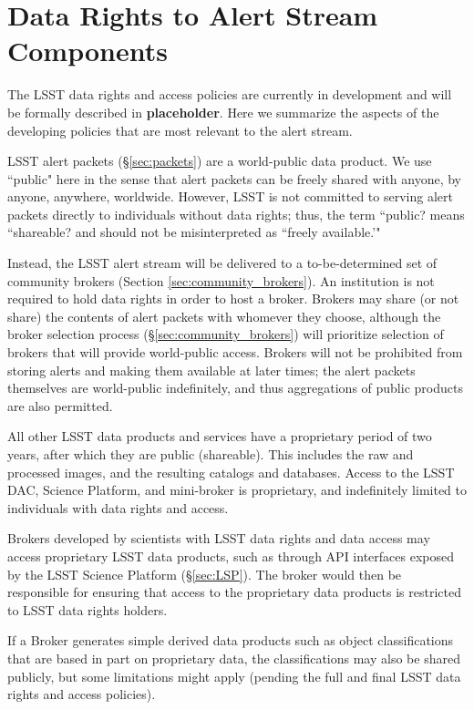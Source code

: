 \section{Data Rights to Alert Stream Components}\label{sec:data_rights}

The LSST data rights and access policies are currently in development and will be formally described in {\bf placeholder}.
Here we summarize the aspects of the developing policies that are most relevant to the alert stream. 

LSST alert packets (\S \ref{sec:packets}) are a world-public data product.
We use ``public" here in the sense that alert packets can be freely shared with anyone, by anyone, anywhere, worldwide.
However, LSST is not committed to serving alert packets directly to individuals without data rights; thus, the term ``public? means ``shareable? and should not be misinterpreted as ``freely available.'"

Instead, the LSST alert stream will be delivered to a to-be-determined set of community brokers (Section \ref{sec:community_brokers}).
An institution is not required to hold data rights in order to host a broker.
Brokers may share (or not share) the contents of alert packets with whomever they choose, although the broker selection process (\S \ref{sec:community_brokers}) will prioritize selection of brokers that will provide world-public access.
Brokers will not be prohibited from storing alerts and making them available at later times; the alert packets themselves are world-public indefinitely, and thus aggregations of public products are also permitted.

All other LSST data products and services have a proprietary period of two years, after which they are public (shareable).
This includes the raw and processed images, and the resulting catalogs and databases.
Access to the LSST DAC, Science Platform, and mini-broker is proprietary, and indefinitely limited to individuals with data rights and access.

Brokers developed by scientists with LSST data rights and data access may access proprietary LSST data products, such as through API interfaces exposed by the LSST Science Platform  (\S \ref{sec:LSP}).
The broker would then be responsible for ensuring that access to the proprietary data products is restricted to LSST data rights holders. 

If a Broker generates simple derived data products such as object classifications that are based in part on proprietary data, the classifications may also be shared publicly, but some limitations might apply (pending the full and final LSST data rights and access policies).


